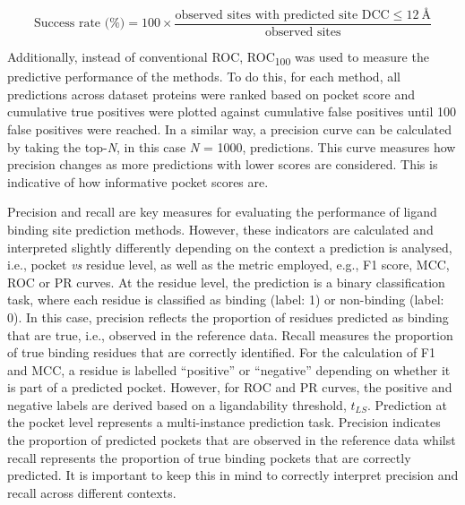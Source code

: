 \begin{equation}
\text{Success rate (\%)} = 100 \times \frac{\text{observed sites with predicted site DCC} \leq 12\: \text{Å}}{\text{observed sites}}
\label{eq:success_rate}
\end{equation}

\vspace{-12pt} %

Additionally, instead of conventional ROC, ROC\textsubscript{100} \cite{WEBBER_2003_ROC100, SCOTT_2007_ROC100} was used to measure the predictive performance of the methods. To do this, for each method, all predictions across dataset proteins were ranked based on pocket score and cumulative true positives were plotted against cumulative false positives until 100 false positives were reached. In a similar way, a precision curve can be calculated by taking the top-\textit{N}, in this case \textit{N} = 1000, predictions. This curve measures how precision changes as more predictions with lower scores are considered. This is indicative of how informative pocket scores are.

Precision and recall are key measures for evaluating the performance of ligand binding site prediction methods. However, these indicators are calculated and interpreted slightly differently depending on the context a prediction is analysed, i.e., pocket \textit{vs} residue level, as well as the metric employed, e.g., F1 score, MCC, ROC or PR curves. At the residue level, the prediction is a binary classification task, where each residue is classified as binding (label: 1) or non-binding (label: 0). In this case, precision reflects the proportion of residues predicted as binding that are true, i.e., observed in the reference data. Recall measures the proportion of true binding residues that are correctly identified. For the calculation of F1 and MCC, a residue is labelled ``positive'' or ``negative'' depending on whether it is part of a predicted pocket. However, for ROC and PR curves, the positive and negative labels are derived based on a ligandability threshold, $t_{LS}$. Prediction at the pocket level represents a multi-instance prediction task. Precision indicates the proportion of predicted pockets that are observed in the reference data whilst recall represents the proportion of true binding pockets that are correctly predicted. It is important to  keep this in mind to correctly interpret precision and recall across different contexts.

